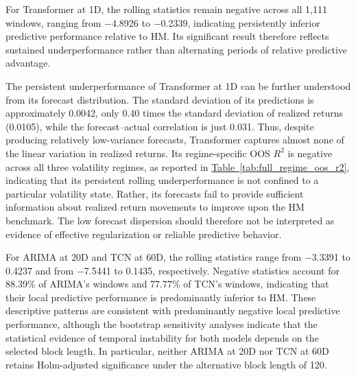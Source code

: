 \documentclass[runningheads,orivec]{llncs}
\begin{document}
For Transformer at 1D, the rolling statistics remain negative across all 1,111 windows, ranging from $-$4.8926 to $-$0.2339, indicating persistently inferior predictive performance relative to HM. Its significant result therefore reflects sustained underperformance rather than alternating periods of relative predictive advantage.

The persistent underperformance of Transformer at 1D can be further understood from its forecast distribution. The standard deviation of its predictions is approximately 0.0042, only 0.40 times the standard deviation of realized returns (0.0105), while the forecast--actual correlation is just 0.031. Thus, despite producing relatively low-variance forecasts, Transformer captures almost none of the linear variation in realized returns. Its regime-specific OOS $R^2$ is negative across all three volatility regimes, as reported in \hyperref[tab:full_regime_oos_r2]{Table~\ref*{tab:full_regime_oos_r2}}, indicating that its persistent rolling underperformance is not confined to a particular volatility state. Rather, its forecasts fail to provide sufficient information about realized return movements to improve upon the HM benchmark. The low forecast dispersion should therefore not be interpreted as evidence of effective regularization or reliable predictive behavior.

For ARIMA at 20D and TCN at 60D, the rolling statistics range from $-$3.3391 to 0.4237 and from $-$7.5441 to 0.1435, respectively. Negative statistics account for 88.39\% of ARIMA's windows and 77.77\% of TCN's windows, indicating that their local predictive performance is predominantly inferior to HM. These descriptive patterns are consistent with predominantly negative local predictive performance, although the bootstrap sensitivity analyses indicate that the statistical evidence of temporal instability for both models depends on the selected block length. In particular, neither ARIMA at 20D nor TCN at 60D retains Holm-adjusted significance under the alternative block length of 120.
\end{document}
